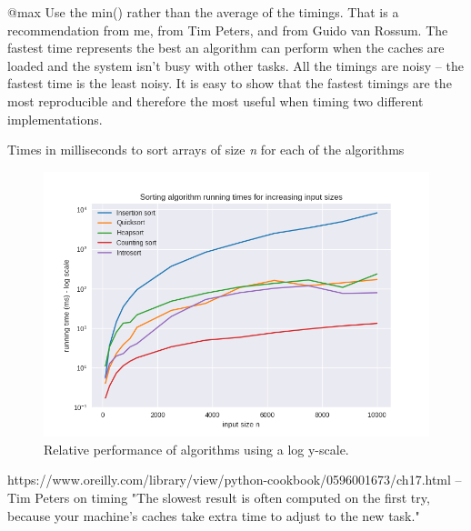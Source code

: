 \documentclass[12pt, a4paper]{article}
\begin{document}
@max Use the min() rather than the average of the timings. That is a recommendation from me, from Tim Peters, and from Guido van Rossum. The fastest time represents the best an algorithm can perform when the caches are loaded and the system isn't busy with other tasks. All the timings are noisy -- the fastest time is the least noisy. It is easy to show that the fastest timings are the most reproducible and therefore the most useful when timing two different implementations.



\begin{table}[h]
    \resizebox{\textwidth}{!}{%
    
    }
\caption{Times in milliseconds to sort arrays of size \emph{n} for each of the algorithms}
\end{table}

\begin{figure}
    \includegraphics[width=\linewidth]{bm_output/plot_0_log_20210510-153504.png}
    \caption{Relative performance of algorithms using a log y-scale.}
    \label{fig:log-perf}
  \end{figure}


https://www.oreilly.com/library/view/python-cookbook/0596001673/ch17.html 
-- Tim Peters on timing \textcite{peters2002}
"The slowest result is often computed on the first try, because your machine’s caches take extra time to adjust to the new task."




\printbibliography
\end{document}
